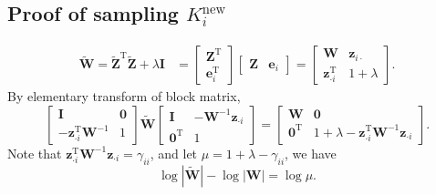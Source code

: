 \documentclass{article}
\begin{document}
\begin{appendices}
  \subsection{Proof of sampling $K_i^\text{new}$}\label{app::proof2}
    \begin{equation}
    \begin{aligned}
      \widetilde{\mathbf{W}} = {\widetilde{\mathbf{Z}}}^{\mathrm{T}}\widetilde{\mathbf{Z}} + \lambda \mathbf{I} &= \begin{bmatrix}
        {\mathbf{Z}}^{\mathrm{T}} \\ {\boldsymbol{e}}_i^{\mathrm{T}}
      \end{bmatrix} \begin{bmatrix}
        \mathbf{Z} & \boldsymbol{e}_i
      \end{bmatrix} = 
      \begin{bmatrix}
        \mathbf{W} & \boldsymbol{z}_{i \cdot} \\
        {\boldsymbol{z}}_{\cdot i}^{\mathrm{T}} & 1 + \lambda
      \end{bmatrix}.
    \end{aligned}
  \end{equation}
    By elementary transform of block matrix, 
    \begin{equation}
      \begin{bmatrix}
      \mathbf{I} & \boldsymbol{0} \\ -{\boldsymbol{z}}_{\cdot i}^{\mathrm{T}} \mathbf{W}^{-1} & 1
    \end{bmatrix}\widetilde{\mathbf{W}}
    \begin{bmatrix}
      \mathbf{I} & -\mathbf{W}^{-1}{\boldsymbol{z}}_{\cdot i}  \\ \boldsymbol{0}^\mathrm{T} & 1
    \end{bmatrix} = \begin{bmatrix}
      \mathbf{W} & \boldsymbol{0} \\ {\boldsymbol{0}}^{\mathrm{T}} & 1 + \lambda - {\boldsymbol{z}}_{\cdot i}^{\mathrm{T}} \mathbf{W}^{-1}{\boldsymbol{z}}_{\cdot i}
    \end{bmatrix}.
    \label{eqn::elemblocktrans}
    \end{equation}
    Note that ${\boldsymbol{z}}_{\cdot i}^{\mathrm{T}} \mathbf{W}^{-1}{\boldsymbol{z}}_{\cdot i} = \gamma_{ii}$, and let $\mu = 1 + \lambda - \gamma_{ii}$, we have
    \begin{equation}\log |\widetilde{\mathbf{W}}| - \log|\mathbf{W}| = \log \mu.\end{equation}

\end{appendices}
\end{document}
